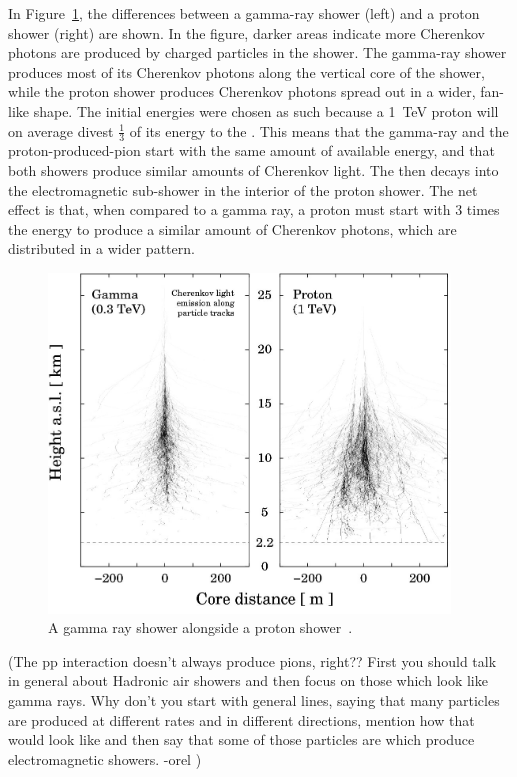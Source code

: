   In Figure~\ref{fig:gamma_vs_proton_airshower}, the differences between a gamma-ray shower (left) and a proton shower (right) are shown.
  In the figure, darker areas indicate more Cherenkov photons are produced by charged particles in the shower.
  The gamma-ray shower produces most of its Cherenkov photons along the vertical core of the shower, while the proton shower produces Cherenkov photons spread out in a wider, fan-like shape.
  The initial energies were chosen as such because a \SI{1}{TeV} proton will on average divest $\frac{1}{3}$ of its energy to the \pio{}.
  This means that the gamma-ray and the proton-produced-pion start with the same amount of available energy, and that both showers produce similar amounts of Cherenkov light.
  The \pio{} then decays into the electromagnetic sub-shower in the interior of the proton shower.
  The net effect is that, when compared to a gamma ray, a proton must start with 3 times the energy to produce a similar amount of Cherenkov photons, which are distributed in a wider pattern.

  \begin{figure}[ht]
    \centering
    \includegraphics[width=0.95\textwidth]{images/showers_gamma_proton}
    \caption[Gamma Ray and Proton Showers]{
      A gamma ray shower alongside a proton shower~\cite{Bernlohr2008149}.
    }
    \label{fig:gamma_vs_proton_airshower}
  \end{figure}
  
  \FloatBarrier

  {\color{red}(The pp interaction doesn't always produce pions, right?? First you should talk in general about Hadronic air showers and then focus on those which look like gamma rays. Why don't you start with general lines, saying that many particles are produced at different rates and in different directions, mention how that would look like and then say that some of those particles are \pio{} which produce electromagnetic showers. -orel )}
  
